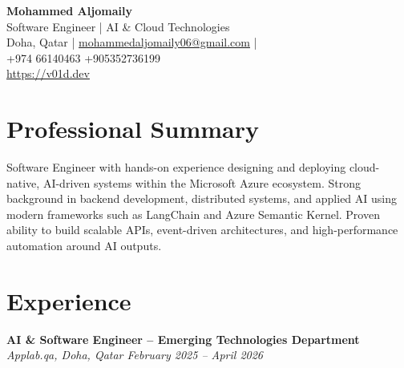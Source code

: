 \documentclass[11pt,a4paper]{article}
\begin{document}
\begin{center}
    {\LARGE \textbf{Mohammed Aljomaily}}\\
    \vspace{4pt}
    Software Engineer | AI \& Cloud Technologies\\
    \vspace{6pt}
    Doha, Qatar |
    \href{mailto:mohammedaljomaily06@gmail.com}{mohammedaljomaily06@gmail.com} | \\
    +974 66140463 +905352736199\\
    \href{https://v01d.dev}{https://v01d.dev}
\end{center}

\section*{Professional Summary}
Software Engineer with hands-on experience designing and deploying cloud-native, AI-driven systems within the Microsoft Azure ecosystem. Strong background in backend development, distributed systems, and applied AI using modern frameworks such as LangChain and Azure Semantic Kernel. Proven ability to build scalable APIs, event-driven architectures, and high-performance automation around AI outputs.

\section*{Experience}
\textbf{AI \& Software Engineer – Emerging Technologies Department}\\
\textit{Applab.qa, Doha, Qatar \hfill February 2025 -- April 2026}
\end{document}
